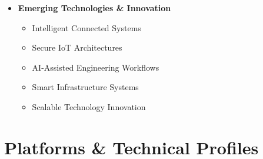 \documentclass[a4paper,11pt]{article}
\begin{document}
\begin{itemize}[leftmargin=0.15in]
\item \textbf{Emerging Technologies \& Innovation}
\begin{itemize}
    \item Intelligent Connected Systems
    \item Secure IoT Architectures
    \item AI-Assisted Engineering Workflows
    \item Smart Infrastructure Systems
    \item Scalable Technology Innovation
\end{itemize}

\end{itemize}




\section{Platforms \& Technical Profiles}
\end{document}
